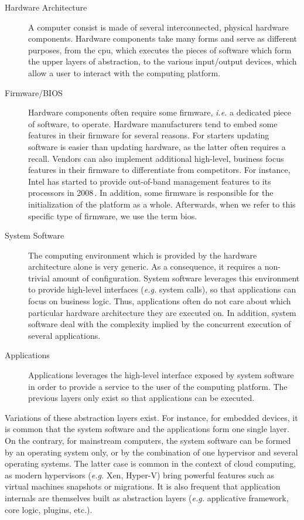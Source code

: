\begin{description}
\item [Hardware Architecture]
  A computer consist is made of several inter\-connected, physical hardware
  components.
  Hardware components take many forms and serve as different purposes, from the
  \ac{cpu}, which executes the pieces of software which form the upper layers of
  abstraction, to the various input/output devices, which allow a user to
  interact with the computing platform.
\item [Firmware/BIOS]
  Hardware components often require some firm\-ware, \emph{i.e.} a dedicated
  piece of software, to operate.
  Hardware manufacturers tend to embed some features in their firmware for
  several reasons.
  For starters updating software is easier than updating hardware, as the latter
  often requires a recall.
  Vendors can also implement additional high-level, business focus features in
  their firmware to differentiate from competitors.
  For instance, Intel has started to provide out-of-band management features to
  its processors in 2008\,\cite{ruan2014me}.
  In addition, some firmware is responsible for the initialization of the
  platform as a whole.
  Afterwards, when we refer to this specific type of firmware, we use the term
  \ac{bios}.
\item [System Software]
  The computing environment which is provided by the hardware architecture alone
  is very generic.
  As a consequence, it requires a non-trivial amount of configuration.
  System software leverages this environment to provide high-level interfaces
  (\emph{e.g.} system calls), so that applications can focus on business
  logic. Thus, applications often do not care about which particular hardware
  architecture they are executed on.
  In addition, system software deal with the complexity implied by the
  concurrent execution of several applications.
\item [Applications]
  Applications leverages the high-level interface exposed by system software in
  order to provide a service to the user of the computing platform.
  The previous layers only exist so that applications can be executed.
\end{description}

Variations of these abstraction layers exist.
%
For instance, for embedded devices, it is common that the system software and
the applications form one single layer.
%
On the contrary, for mainstream computers, the system software can be formed by
an operating system only, or by the combination of one hypervisor and several
operating systems.
%
The latter case is common in the context of cloud computing, as modern
hypervisors (\emph{e.g.} Xen, Hyper-V) bring powerful features such as virtual
machines snapshots or migrations. 
%
It is also frequent that application internals are themselves built as
abstraction layers (\emph{e.g.} applicative framework, core logic, plugins,
etc.).

